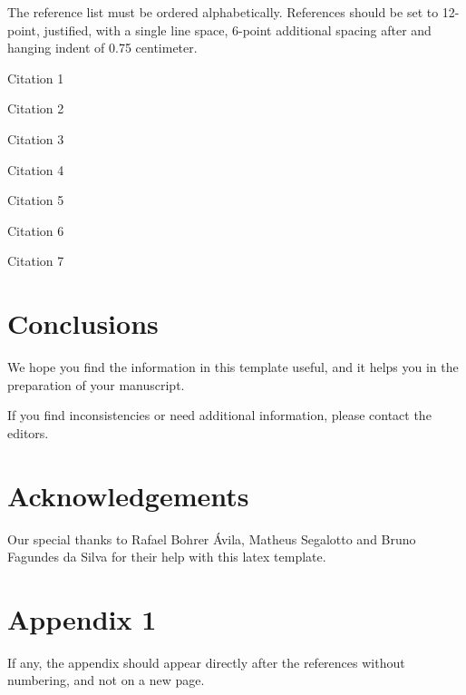 \documentclass[english, spanish, brazilian]{RBIEarticle} %
\begin{document}
The reference list must be ordered alphabetically. References should be set to 12-point, justified, with a single line space, 6-point additional spacing after and hanging indent of 0.75 centimeter.

Citation 1 \parencite{Baker2011}

Citation 2 \parencite{Seffrin2013}

Citation 3 \parencite{Brasil2008}

Citation 4 \parencite{Kautzman2015}

Citation 5 \parencite{Sweller1991}

Citation 6 \parencite{Clark2006}

Citation 7 \parencite{Mason2012}


\section{Conclusions}
We hope you find the information in this template useful, and it helps you in the preparation of your manuscript.

If you find inconsistencies or need additional information, please contact the editors.


\section*{Acknowledgements}
Our special thanks to Rafael Bohrer Ávila, Matheus Segalotto and Bruno Fagundes da Silva for their help with this latex template. 



\printbibliography


 \section*{Appendix 1}
\label{apendice1}

If any, the appendix should appear directly after the references without numbering, and not on a new page.
\end{document}
